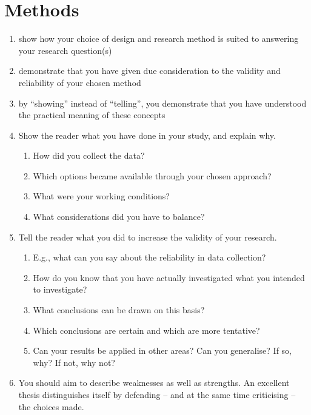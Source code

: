 
\section{Methods}
\label{sec:meth}
 
 \begin{enumerate}
     \item show how your choice of design and research method is suited to answering your research question(s)
     \item demonstrate that you have given due consideration to the validity and reliability of your chosen method
     \item by “showing” instead of “telling”, you demonstrate that you have understood the practical meaning of these concepts
     \item Show the reader what you have done in your study, and explain why. 
     \begin{enumerate}
         \item How did you collect the data? 
         \item Which options became available through your chosen approach?
         \item What were your working conditions? 
         \item What considerations did you have to balance?
     \end{enumerate}
    \item Tell the reader what you did to increase the validity of your research. 
    \begin{enumerate}
        \item E.g., what can you say about the reliability in data collection? 
        \item How do you know that you have actually investigated what you intended to investigate? 
        \item What conclusions can be drawn on this basis? 
        \item Which conclusions are certain and which are more tentative?
        \item Can your results be applied in other areas? Can you generalise? If so, why? If not, why not?
    \end{enumerate}
    \item You should aim to describe weaknesses as well as strengths. An excellent thesis distinguishes itself by defending – and at the same time criticising – the choices made.
 \end{enumerate}